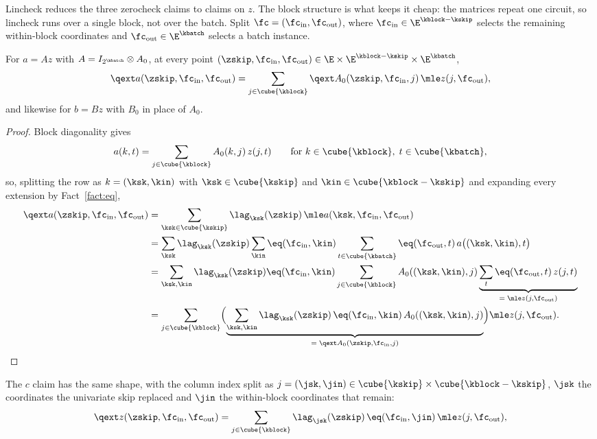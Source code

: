 Lincheck reduces the three zerocheck claims to claims on $z$. The block structure is what keeps it cheap: the matrices repeat one circuit, so lincheck runs over a single block, not over the batch. Split $\fc=(\fc_{\mathrm{in}},\fc_{\mathrm{out}})$, where $\fc_{\mathrm{in}}\in\E^{\kblock-\kskip}$ selects the remaining within-block coordinates and $\fc_{\mathrm{out}}\in\E^{\kbatch}$ selects a batch instance.

\begin{lemma}\label{lem:flock-block-diagonal}
For $a=Az$ with $A=I_{2^{\kbatch}}\otimes A_0$, at every point $(\zskip,\fc_{\mathrm{in}},\fc_{\mathrm{out}})\in\E\times\E^{\kblock-\kskip}\times\E^{\kbatch}$,
\[
\qext a(\zskip,\fc_{\mathrm{in}},\fc_{\mathrm{out}})=\sum_{j\in\cube{\kblock}}\qext A_0(\zskip,\fc_{\mathrm{in}},j)\,\mle z(j,\fc_{\mathrm{out}}),
\]
and likewise for $b=Bz$ with $B_0$ in place of $A_0$.
\end{lemma}

\begin{proof}
Block diagonality gives
\[
a(k,t)=\sum_{j\in\cube{\kblock}}A_0(k,j)\,z(j,t)\qquad\text{for }k\in\cube{\kblock},\;t\in\cube{\kbatch},
\]
so, splitting the row as $k=(\ksk,\kin)$ with $\ksk\in\cube{\kskip}$ and $\kin\in\cube{\kblock-\kskip}$ and expanding every extension by Fact~\ref{fact:eq},
\begin{align*}
\qext a(\zskip,\fc_{\mathrm{in}},\fc_{\mathrm{out}})&=\sum_{\ksk\in\cube{\kskip}}\lag_{\ksk}(\zskip)\,\mle a(\ksk,\fc_{\mathrm{in}},\fc_{\mathrm{out}})\\
&=\sum_{\ksk}\lag_{\ksk}(\zskip)\sum_{\kin}\eq(\fc_{\mathrm{in}},\kin)\sum_{t\in\cube{\kbatch}}\eq(\fc_{\mathrm{out}},t)\,a\bigl((\ksk,\kin),t\bigr)\\
&=\sum_{\ksk,\kin}\lag_{\ksk}(\zskip)\eq(\fc_{\mathrm{in}},\kin)\sum_{j\in\cube{\kblock}}A_0((\ksk,\kin),j)\underbrace{\sum_{t}\eq(\fc_{\mathrm{out}},t)\,z(j,t)}_{=\;\mle z(j,\fc_{\mathrm{out}})}\\
&=\sum_{j\in\cube{\kblock}}\Bigl(\underbrace{\sum_{\ksk,\kin}\lag_{\ksk}(\zskip)\,\eq(\fc_{\mathrm{in}},\kin)\,A_0((\ksk,\kin),j)}_{=\;\qext A_0(\zskip,\fc_{\mathrm{in}},j)}\Bigr)\mle z(j,\fc_{\mathrm{out}}).
\end{align*}
\end{proof}

The $c$ claim has the same shape, with the column index split as $j=(\jsk,\jin) \in\cube{\kskip} \times \cube{\kblock-\kskip}$, $\jsk$ the coordinates the univariate skip replaced and $\jin$ the within-block coordinates that remain:
\begin{equation}\label{flock:eq:c-as-column}
\qext z(\zskip,\fc_{\mathrm{in}},\fc_{\mathrm{out}})=\sum_{j\in\cube{\kblock}}\lag_{\jsk}(\zskip)\,\eq(\fc_{\mathrm{in}},\jin)\,\mle z(j,\fc_{\mathrm{out}}),
\end{equation}

